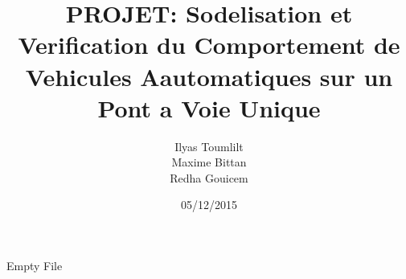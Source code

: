 \documentclass[a4paper, 11pt]{article}
\begin{document}
 
\title{PROJET: Sodelisation et Verification du Comportement de Vehicules Aautomatiques sur un Pont a Voie Unique}
\author{Ilyas Toumlilt\\Maxime Bittan\\Redha Gouicem}
\date{05/12/2015}
 
\maketitle

Empty File
\end{document}
